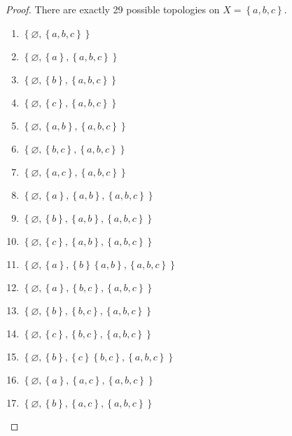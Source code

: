 \begin{proof}
    There are exactly 29 possible topologies on \( X = \left\{ a, b, c \right\} \).
    \begin{enumerate}
        \item \( \left\{ \varnothing, \left\{ a, b, c \right\} \right\} \)
        \item \( \left\{ \varnothing, \left\{ a \right\}, \left\{ a, b, c \right\} \right\} \)
        \item \( \left\{ \varnothing, \left\{ b \right\}, \left\{ a, b, c \right\} \right\} \)
        \item \( \left\{ \varnothing, \left\{ c \right\}, \left\{ a, b, c \right\} \right\} \)
        \item \( \left\{ \varnothing, \left\{ a, b \right\}, \left\{ a, b, c \right\} \right\} \)
        \item \( \left\{ \varnothing, \left\{ b, c \right\}, \left\{ a, b, c \right\} \right\} \)
        \item \( \left\{ \varnothing, \left\{ a, c \right\}, \left\{ a, b, c \right\} \right\} \)
        \item \( \left\{ \varnothing, \left\{ a \right\}, \left\{ a, b \right\}, \left\{ a, b, c \right\} \right\} \)
        \item \( \left\{ \varnothing, \left\{ b \right\}, \left\{ a, b \right\}, \left\{ a, b, c \right\} \right\} \)
        \item \( \left\{ \varnothing, \left\{ c \right\}, \left\{ a, b \right\}, \left\{ a, b, c \right\} \right\} \)
        \item \( \left\{ \varnothing, \left\{ a \right\}, \left\{ b \right\} \left\{ a, b \right\}, \left\{ a, b, c \right\} \right\} \)
        \item \( \left\{ \varnothing, \left\{ a \right\}, \left\{ b, c \right\}, \left\{ a, b, c \right\} \right\} \)
        \item \( \left\{ \varnothing, \left\{ b \right\}, \left\{ b, c \right\}, \left\{ a, b, c \right\} \right\} \)
        \item \( \left\{ \varnothing, \left\{ c \right\}, \left\{ b, c \right\}, \left\{ a, b, c \right\} \right\} \)
        \item \( \left\{ \varnothing, \left\{ b \right\}, \left\{ c \right\} \left\{ b, c \right\}, \left\{ a, b, c \right\} \right\} \)
        \item \( \left\{ \varnothing, \left\{ a \right\}, \left\{ a, c \right\}, \left\{ a, b, c \right\} \right\} \)
        \item \( \left\{ \varnothing, \left\{ b \right\}, \left\{ a, c \right\}, \left\{ a, b, c \right\} \right\} \)

\end{enumerate}
\end{proof}
